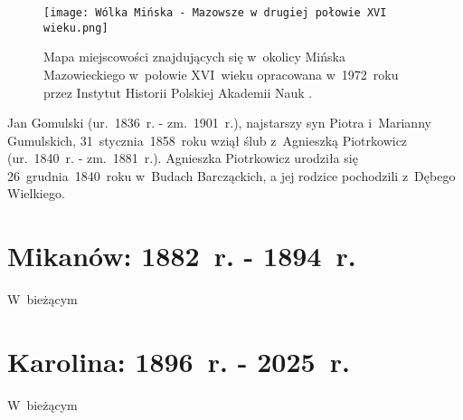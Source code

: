 \begin{figure}[!ht]
    \vspace*{0.5cm}
    \centering \texttt{[image: 
        Wólka Mińska - Mazowsze w drugiej połowie XVI wieku.png]}
    \captionsetup{format=hang}
    \caption{Mapa miejscowości znajdujących się w~okolicy Mińska Mazowieckiego 
    w~połowie XVI~wieku opracowana w~1972~roku przez Instytut Historii 
    Polskiej Akademii Nauk \cite{palucki}.}
    \label{fig:wolka_minska_xvi}
\end{figure}

Jan Gomulski (ur.~1836~r. - zm.~1901~r.), najstarszy syn Piotra i~Marianny 
Gumulskich, 31~stycznia~1858~roku wziął ślub z~Agnieszką Piotrkowicz 
(ur.~1840~r. - zm.~1881~r.). Agnieszka Piotrkowicz urodziła się 
26~grudnia~1840~roku w~Budach Barcząckich, a jej rodzice pochodzili 
z~Dębego Wielkiego.

\newpage
\ifodd\value{page}\hbox{}\newpage\fi



\section{Mikanów: 1882~r. - 1894~r.}

W~bieżącym


\newpage
\ifodd\value{page}\hbox{}\newpage\fi



\section{Karolina: 1896~r. - 2025~r.}

W~bieżącym

